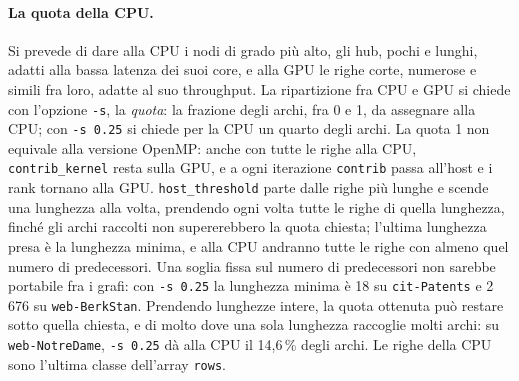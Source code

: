 \documentclass[11pt,a4paper]{article}
\begin{document}
\paragraph{La quota della CPU.}
Si prevede di dare alla CPU i nodi di grado più alto,
gli hub, pochi e lunghi, adatti alla bassa latenza dei suoi core, e alla GPU le
righe corte, numerose e simili fra loro, adatte al suo throughput. La
ripartizione fra CPU e GPU si chiede con l'opzione \texttt{-s}, la
\emph{quota}: la frazione degli archi, fra 0 e 1, da assegnare alla CPU; con
\texttt{-s 0.25} si chiede per la CPU un quarto degli archi. La quota 1 non
equivale alla versione OpenMP: anche con tutte le righe alla CPU,
\texttt{contrib\_kernel} resta sulla GPU, e a ogni iterazione \texttt{contrib}
passa all'host e i rank tornano alla GPU.
\texttt{host\_threshold} parte dalle righe più lunghe e scende una lunghezza
alla volta, prendendo ogni volta tutte le righe di quella lunghezza, finché gli
archi raccolti non supererebbero la quota chiesta; l'ultima lunghezza presa è
la lunghezza minima, e alla CPU andranno tutte le righe con almeno quel numero
di predecessori. Una soglia fissa sul numero di predecessori non sarebbe
portabile fra i grafi: con \texttt{-s 0.25} la lunghezza minima è 18 su
\texttt{cit-Patents} e 2\,676 su \texttt{web-BerkStan}. Prendendo lunghezze
intere, la quota ottenuta può
restare sotto quella chiesta, e di molto dove una sola lunghezza raccoglie
molti archi: su \texttt{web-NotreDame}, \texttt{-s 0.25} dà alla CPU il
14,6\,\% degli archi. Le righe della CPU sono l'ultima classe dell'array
\texttt{rows}.
\end{document}
